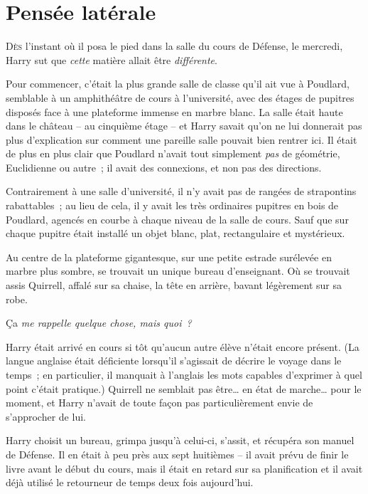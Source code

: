 
\chapter{Pensée latérale}

\lettrine{D}{ès} l'instant où il posa le pied dans la salle du cours de Défense, le mercredi, Harry sut que \emph{cette} matière allait être \emph{différente}.

Pour commencer, c'était la plus grande salle de classe qu'il ait vue à Poudlard, semblable à un amphithéâtre de cours à l'université, avec des étages de pupitres disposés face à une plateforme immense en marbre blanc.
La salle était haute dans le château -- au cinquième étage -- et Harry savait qu'on ne lui donnerait pas plus d'explication sur comment une pareille salle pouvait bien rentrer ici.
Il était de plus en plus clair que Poudlard n'avait tout simplement \emph{pas} de géométrie, Euclidienne ou autre~; il avait des connexions, et non pas des directions.

Contrairement à une salle d'université, il n'y avait pas de rangées de strapontins rabattables~; au lieu de cela, il y avait les très ordinaires pupitres en bois de Poudlard, agencés en courbe à chaque niveau de la salle de cours.
Sauf que sur chaque pupitre était installé un objet blanc, plat, rectangulaire et mystérieux.

Au centre de la plateforme gigantesque, sur une petite estrade surélevée en marbre plus sombre, se trouvait un unique bureau d'enseignant.
Où se trouvait assis Quirrell, affalé sur sa chaise, la tête en arrière, bavant légèrement sur sa robe.

Ça \emph{me rappelle quelque chose, mais quoi~?}

Harry était arrivé en cours si tôt qu'aucun autre élève n'était encore présent.
(La langue anglaise était déficiente lorsqu'il s'agissait de décrire le voyage dans le temps~;
en particulier, il manquait à l'anglais les mots capables d'exprimer à quel point c'était pratique.)
Quirrell ne semblait pas être… en état de marche… pour le moment, et Harry n'avait de toute façon pas particulièrement envie de s'approcher de lui.

Harry choisit un bureau, grimpa jusqu'à celui-ci, s'assit, et récupéra son manuel de Défense.
Il en était à peu près aux sept huitièmes -- il avait prévu de finir le livre avant le début du cours, mais il était en retard sur sa planification et il avait déjà utilisé le retourneur de temps deux fois aujourd'hui.

